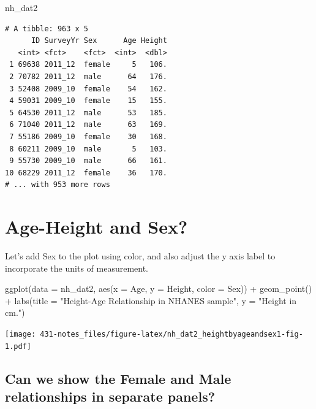 \documentclass[
]{book}
\newenvironment{Shaded}{\begin{snugshade}}{\end{snugshade}}
\newcommand{\AttributeTok}[1]{\textcolor[rgb]{0.77,0.63,0.00}{#1}}
\newcommand{\FunctionTok}[1]{\textcolor[rgb]{0.00,0.00,0.00}{#1}}
\newcommand{\NormalTok}[1]{#1}
\newcommand{\SpecialCharTok}[1]{\textcolor[rgb]{0.00,0.00,0.00}{#1}}
\newcommand{\StringTok}[1]{\textcolor[rgb]{0.31,0.60,0.02}{#1}}
\begin{document}
\begin{Shaded}
\begin{Highlighting}[]
\NormalTok{nh\_dat2}
\end{Highlighting}
\end{Shaded}

\begin{verbatim}
# A tibble: 963 x 5
      ID SurveyYr Sex      Age Height
   <int> <fct>    <fct>  <int>  <dbl>
 1 69638 2011_12  female     5   106.
 2 70782 2011_12  male      64   176.
 3 52408 2009_10  female    54   162.
 4 59031 2009_10  female    15   155.
 5 64530 2011_12  male      53   185.
 6 71040 2011_12  male      63   169.
 7 55186 2009_10  female    30   168.
 8 60211 2009_10  male       5   103.
 9 55730 2009_10  male      66   161.
10 68229 2011_12  female    36   170.
# ... with 953 more rows
\end{verbatim}

\hypertarget{age-height-and-sex}{%
\section{Age-Height and Sex?}\label{age-height-and-sex}}

Let's add Sex to the plot using color, and also adjust the y axis label to incorporate the units of measurement.

\begin{Shaded}
\begin{Highlighting}[]
\FunctionTok{ggplot}\NormalTok{(}\AttributeTok{data =}\NormalTok{ nh\_dat2, }\FunctionTok{aes}\NormalTok{(}\AttributeTok{x =}\NormalTok{ Age, }\AttributeTok{y =}\NormalTok{ Height, }\AttributeTok{color =}\NormalTok{ Sex)) }\SpecialCharTok{+}
    \FunctionTok{geom\_point}\NormalTok{() }\SpecialCharTok{+}
    \FunctionTok{labs}\NormalTok{(}\AttributeTok{title =} \StringTok{"Height{-}Age Relationship in NHANES sample"}\NormalTok{, }
         \AttributeTok{y =} \StringTok{"Height in cm."}\NormalTok{)}
\end{Highlighting}
\end{Shaded}

\texttt{[image: 431-notes\_files/figure-latex/nh\_dat2\_heightbyageandsex1-fig-1.pdf]}

\hypertarget{can-we-show-the-female-and-male-relationships-in-separate-panels}{%
\subsection{Can we show the Female and Male relationships in separate panels?}\label{can-we-show-the-female-and-male-relationships-in-separate-panels}}
\end{document}
